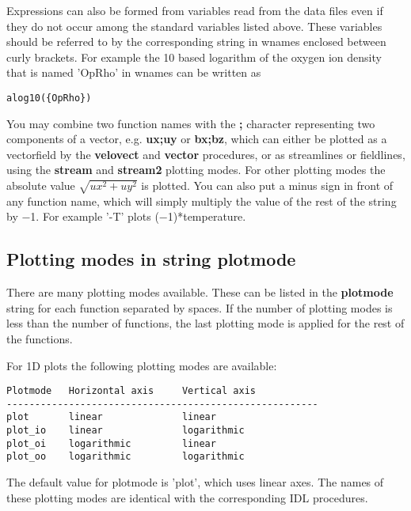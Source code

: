    Expressions can also be formed from variables read from the data files
   even if they do not occur among the standard variables listed above.
   These variables should be referred to by the corresponding string 
   in wnames enclosed between curly brackets.
   For example the 10 based logarithm of the oxygen ion density that is named 
   'OpRho' in wnames can be written as
\begin{verbatim}
alog10({OpRho})
\end{verbatim}
   You may combine two function names with the {\bf ;} character representing
   two components of a vector, 
   e.g. {\bf ux;uy} or {\bf bx;bz}, which can either be plotted as a 
   vectorfield by the {\bf velovect} and {\bf vector} procedures, 
   or as streamlines or fieldlines, using the 
   {\bf stream} and {\bf stream2} plotting modes.
   For other plotting modes the absolute value
   $\sqrt{ux^2+uy^2}$ is plotted.
   You can also put a minus sign in front of any function name, which
   will simply multiply the value of the rest of the string by $-$1. 
   For example '-T' plots ($-$1)*temperature.

\subsection{Plotting modes in string plotmode \label{s-plotmode}}

There are many plotting modes available. 
These can be listed in the {\bf plotmode} string for each function separated 
by spaces. If the number of plotting modes is less than the number of functions,
the last plotting mode is applied for the rest of the functions.

For 1D plots the following plotting modes are available: 
\begin{verbatim}
Plotmode   Horizontal axis     Vertical axis
-------------------------------------------------------
plot       linear              linear
plot_io    linear              logarithmic
plot_oi    logarithmic         linear
plot_oo    logarithmic         logarithmic
\end{verbatim}
The default value for plotmode is 'plot', which uses linear axes.
The names of these plotting modes are identical with the corresponding IDL
procedures.

